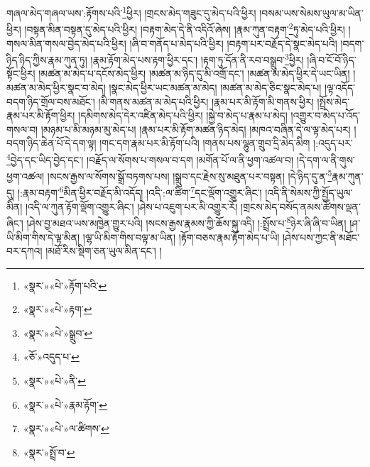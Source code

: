 གཞལ་མེད་གཞལ་ཡས་:རྟོགས་པའི་\footnote{«སྣར་»«པེ་»རྟོག་པའི་}ཕྱིར། །གྲངས་མེད་གཟུང་དུ་མེད་པའི་ཕྱིར། །བསམ་ཡས་སེམས་ཡུལ་མ་ཡིན་ཕྱིར། །བསྟན་མིན་བསྟན་དུ་མེད་པའི་ཕྱིར། །བརྟག་མེད་དེ་ནི་འདིའོ་ཞེས། །རྣམ་ཀུན་བརྟག་\footnote{«སྣར་»«པེ་»རྟག་}ཏུ་མེད་པའི་ཕྱིར། །གསལ་མིན་གསལ་བྱེད་མེད་པའི་ཕྱིར། །ཞི་བ་གནོད་པ་མེད་པའི་ཕྱིར། །བརྟག་པར་བརྗོད་དེ་སྣང་མེད་པའི། །བདག་ཉིད་ཉིད་ཀྱིས་རྣམ་ཀུན་ཏུ། །རྣམ་རྟོག་མེད་པས་རྟག་ཕྱིར་དང་། །རྟག་ཏུ་དོན་ནི་རབ་བསྒྲུབ་\footnote{«སྣར་»«པེ་»སྒྲུབ་}ཕྱིར། །ཞི་བ་ངོ་བོ་ཉིད་སྟོང་ཕྱིར། །མཚན་མ་མེད་པ་དངོས་མེད་ཕྱིར། །མཚན་མ་ཉིད་དུ་མི་འགྲོ་དང་། །མཚན་མ་མེད་ཕྱིར་དེ་ཡང་ཡིན། །མཚན་མ་མེད་ཕྱིར་སྣང་བ་མེད། །སྣང་མེད་ཕྱིར་ཡང་མཚན་མ་མེད། །མཚན་མ་མེད་ཅིང་སྣང་མེད་པ། །ལྟ་འདོད་བདག་ཉིད་གྲོལ་བས་མཐོང་། །མི་གནས་མཚན་མ་མེད་པའི་ཕྱིར། །རྣམ་པར་མི་རྟོག་མི་གནས་ཕྱིར། །སྤྲོས་མེད་རྣམ་པར་མི་རྟོག་ཕྱིར། །དམིགས་མེད་དེར་འཛིན་མེད་པའི་ཕྱིར། །སྐྱེ་བ་མེད་པ་རྣམ་པ་མེད། །འགྱུར་བ་མེད་པ་འོད་གསལ་བ། །མཉམ་པ་མི་མཉམ་མུ་མེད་པ། །རྣམ་པར་མི་རྟོག་མཚན་ཉིད་མེད། །མཁའ་བཞིན་དེ་ལ་ལྟ་མེད་པར། །བདག་ཉིད་ཆེན་པོ་དེ་དག་ལྟ། །གང་དག་རྣམ་པར་མི་རྟོག་པའི། །གནས་པས་ལྷུན་གྲུབ་དྲི་མེད་མིག །:འདུད་པར་\footnote{«ཅོ་»འདུད་པ་}བྱེད་དང་ཡིད་བྱེད་དང་། །བརྗོད་ལ་སོགས་པ་གསལ་བ་དག །མགོན་པོ་ལ་ནི་ཕྱག་འཚལ་བ། །དེ་དག་ལ་ནི་གུས་ཕྱག་འཚལ། །སངས་རྒྱས་ལ་སོགས་སྒྲོ་བཏགས་པས། །སྒྲུབ་དང་རྗེས་སུ་མཐུན་པར་བསྟན། །དེ་ཉིད་དུ་ན་\footnote{«སྣར་»«པེ་»ནི་}རྣམ་ཀུན་དུ། །:རྣམ་བརྟག་\footnote{«སྣར་»«པེ་»རྣམ་རྟོག་}མིན་ཕྱིར་བརྗོད་མི་འདོད། །འདི་:ལ་ཚིག་\footnote{«སྣར་»«པེ་»ལ་ཚིགས་}དང་ལྡོག་འགྱུར་ཞིང་། །འདི་ནི་སེམས་ཀྱི་སྤྱོད་ཡུལ་མིན། །འདི་ལ་ཀུན་རྟོག་ལྡོག་འགྱུར་ཞིང་། །ཤེས་པ་འཇུག་པར་མི་འགྱུར་རོ། །གྲངས་མེད་བསོད་ནམས་ཚོགས་ལྡན་ཞིང་། །ཤེས་བྱ་མཐའ་ཡས་མཁྱེན་གྱུར་པའི། །སངས་རྒྱས་རྣམས་ཀྱི་ཆོས་སྐུ་འདི། །:སྤྲོས་པ་\footnote{«སྣར་»སྤྲོ་བ་}ཉེར་ཞི་ཞི་བ་ཡིན། །ཤ་ཡི་མིག་གིས་དེ་ལྟ་མིན། །ལྷ་ཡི་མིག་གིས་བལྟ་མ་ཡིན། །རྟོག་བཅས་རྣམ་རྟོག་མེད་པ་ཡི། །ཤེས་པས་ཀྱང་ནི་མཐོང་བར་དཀའ། །མཐོ་རིས་སྡིག་ཅན་ཡུལ་མིན་དང་། །
